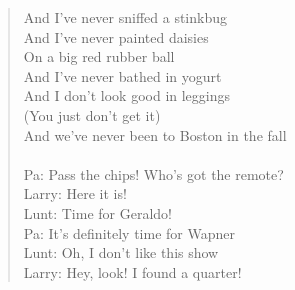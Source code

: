 \documentclass[11pt]{article}
\begin{document}
\begin{verse}
And I've never sniffed a stinkbug\\
And I've never painted daisies\\
On a big red rubber ball\\
And I've never bathed in yogurt\\
And I don't look good in leggings\\
(You just don't get it)\\
[All:] And we've never been to Boston in the fall\\
[Outro]\\
Pa: Pass the chips! Who’s got the remote?\\
Larry: Here it is!\\
Lunt: Time for Geraldo!\\
Pa: It’s definitely time for Wapner\\
Lunt: Oh, I don’t like this show\\
Larry: Hey, look! I found a quarter!\\
\end{verse}
\clearpage
\end{document}
